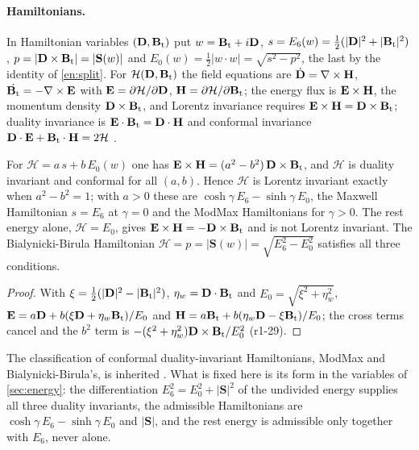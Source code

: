 \paragraph{Hamiltonians.} In Hamiltonian variables $(\mathbf D,\mathbf B_{\rm t})$ put $w=\mathbf B_{\rm t}+i\mathbf D$, $s=E_6(w)=\tfrac12(|\mathbf D|^2+|\mathbf B_{\rm t}|^2)$,
$p=|\mathbf D\times\mathbf B_{\rm t}|=|\mathbf S(w)|$ and $E_0(w)=\tfrac12|w\cdot w|=\sqrt{s^2-p^2}$, the last by the identity of \cref{en:split}. For $\mathcal H(\mathbf D,\mathbf B_{\rm t})$ the field equations are $\dot{\mathbf D}=\nabla\times\mathbf H$, $\dot{\mathbf B_{\rm t}}=-\nabla\times\mathbf E$ with
$\mathbf E=\partial\mathcal H/\partial\mathbf D$, $\mathbf H=\partial\mathcal H/\partial\mathbf B_{\rm t}$; the energy flux is $\mathbf E\times\mathbf H$, the
momentum density $\mathbf D\times\mathbf B_{\rm t}$, and Lorentz invariance requires $\mathbf E\times\mathbf H=\mathbf D\times\mathbf B_{\rm t}$; duality invariance is
$\mathbf E\cdot\mathbf B_{\rm t}=\mathbf D\cdot\mathbf H$ and conformal invariance $\mathbf D\cdot\mathbf E+\mathbf B_{\rm t}\cdot\mathbf H=2\mathcal H$
\cite{BialynickiBirula83,BandosLechnerSorokinTownsend20}.

\begin{proposition}
\label{r1:prop:ham}
For $\mathcal H=a\,s+b\,E_0(w)$ one has $\mathbf E\times\mathbf H=(a^2-b^2)\,\mathbf D\times\mathbf B_{\rm t}$, and $\mathcal H$ is duality invariant and
conformal for all $(a,b)$. Hence $\mathcal H$ is Lorentz invariant exactly when $a^2-b^2=1$; with $a>0$ these are
$\cosh\gamma\,E_6-\sinh\gamma\,E_0$, the Maxwell Hamiltonian $s=E_6$ at $\gamma=0$ and the ModMax Hamiltonians for $\gamma>0$. The rest energy alone, $\mathcal H=E_0$, gives $\mathbf E\times\mathbf H=-\mathbf D\times\mathbf B_{\rm t}$
and is not Lorentz invariant. The Bialynicki-Birula Hamiltonian $\mathcal H=p=|\mathbf S(w)|=\sqrt{E_6^2-E_0^2}$ satisfies all three
conditions.
\end{proposition}

\begin{proof}
With $\xi=\tfrac12(|\mathbf D|^2-|\mathbf B_{\rm t}|^2)$, $\eta_w=\mathbf D\cdot\mathbf B_{\rm t}$ and $E_0=\sqrt{\xi^2+\eta_w^2}$,
$\mathbf E=a\mathbf D+b(\xi\mathbf D+\eta_w\mathbf B_{\rm t})/E_0$ and $\mathbf H=a\mathbf B_{\rm t}+b(\eta_w\mathbf D-\xi\mathbf B_{\rm t})/E_0$; the cross terms cancel and the
$b^2$ term is $-(\xi^2+\eta_w^2)\mathbf D\times\mathbf B_{\rm t}/E_0^2$ (r1-29).
\end{proof}

The classification of conformal duality-invariant Hamiltonians, ModMax and Bialynicki-Birula's, is inherited
\cite{BandosLechnerSorokinTownsend20,BialynickiBirula83}. What is fixed here is its form in the variables of \cref{sec:energy}: the differentiation
$E_6^2=E_0^2+|\mathbf S|^2$ of the undivided energy supplies all three duality invariants, the admissible Hamiltonians are $\cosh\gamma\,E_6-\sinh\gamma\,E_0$
and $|\mathbf S|$, and the rest energy is admissible only together with $E_6$, never alone.

